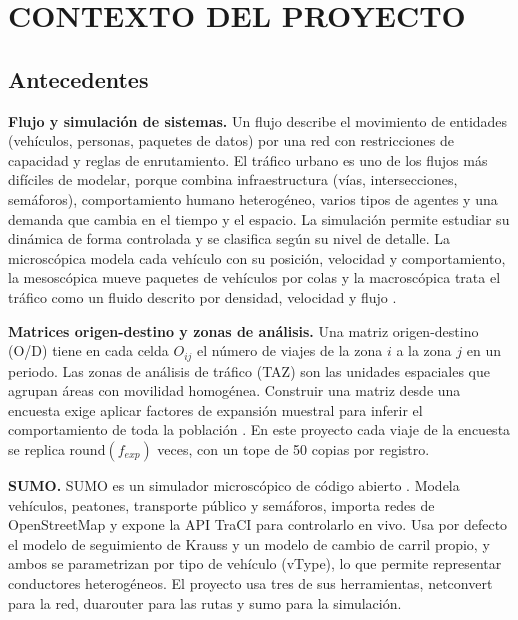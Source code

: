 \setcounter{subsection}{0}
\section{CONTEXTO DEL PROYECTO}

\subsection{Antecedentes}

\textbf{Flujo y simulación de sistemas.} Un flujo describe el movimiento de entidades (vehículos, personas, paquetes de datos) por una red con restricciones de capacidad y reglas de enrutamiento. El tráfico urbano es uno de los flujos más difíciles de modelar, porque combina infraestructura (vías, intersecciones, semáforos), comportamiento humano heterogéneo, varios tipos de agentes y una demanda que cambia en el tiempo y el espacio. La simulación permite estudiar su dinámica de forma controlada y se clasifica según su nivel de detalle. La microscópica modela cada vehículo con su posición, velocidad y comportamiento, la mesoscópica mueve paquetes de vehículos por colas y la macroscópica trata el tráfico como un fluido descrito por densidad, velocidad y flujo \cite{lighthill,daganzo}.

\textbf{Matrices origen-destino y zonas de análisis.} Una matriz origen-destino (O/D) tiene en cada celda $O_{ij}$ el número de viajes de la zona $i$ a la zona $j$ en un periodo. Las zonas de análisis de tráfico (TAZ) son las unidades espaciales que agrupan áreas con movilidad homogénea. Construir una matriz desde una encuesta exige aplicar factores de expansión muestral para inferir el comportamiento de toda la población \cite{ortuzar}. En este proyecto cada viaje de la encuesta se replica $\mathrm{round}(f_{exp})$ veces, con un tope de 50 copias por registro.

\textbf{SUMO.} SUMO es un simulador microscópico de código abierto \cite{behrisch_et_al_sumo_overview_2011,krajzewicz2012}. Modela vehículos, peatones, transporte público y semáforos, importa redes de OpenStreetMap y expone la API TraCI para controlarlo en vivo. Usa por defecto el modelo de seguimiento de Krauss y un modelo de cambio de carril propio, y ambos se parametrizan por tipo de vehículo (vType), lo que permite representar conductores heterogéneos. El proyecto usa tres de sus herramientas, netconvert para la red, duarouter para las rutas y sumo para la simulación.

